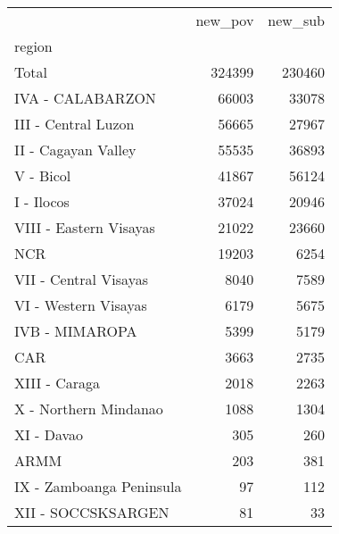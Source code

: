 \begin{tabular}{lrr}
\toprule
{} &  new\_pov &  new\_sub \\
region                   &          &          \\
\midrule
Total                    &   324399 &   230460 \\
IVA - CALABARZON         &    66003 &    33078 \\
III - Central Luzon      &    56665 &    27967 \\
II - Cagayan Valley      &    55535 &    36893 \\
V - Bicol                &    41867 &    56124 \\
I - Ilocos               &    37024 &    20946 \\
VIII - Eastern Visayas   &    21022 &    23660 \\
NCR                      &    19203 &     6254 \\
VII - Central Visayas    &     8040 &     7589 \\
VI - Western Visayas     &     6179 &     5675 \\
IVB - MIMAROPA           &     5399 &     5179 \\
CAR                      &     3663 &     2735 \\
XIII - Caraga            &     2018 &     2263 \\
X - Northern Mindanao    &     1088 &     1304 \\
XI - Davao               &      305 &      260 \\
ARMM                     &      203 &      381 \\
IX - Zamboanga Peninsula &       97 &      112 \\
XII - SOCCSKSARGEN       &       81 &       33 \\
\bottomrule
\end{tabular}

